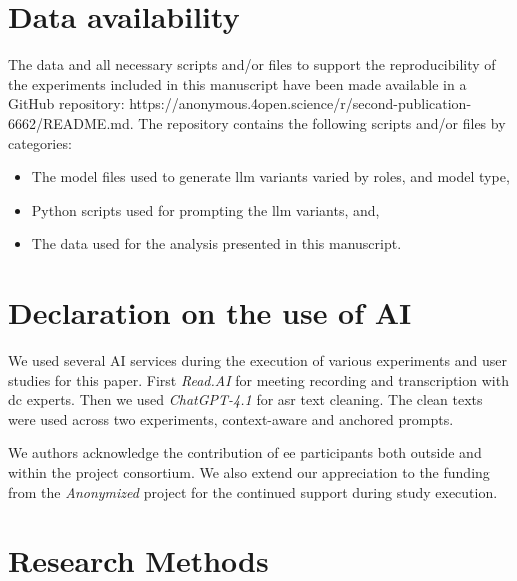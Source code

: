 \documentclass[manuscript,review,anonymous]{acmart}
\begin{document}
\section{Data availability}
The data and all necessary scripts and/or files to support the reproducibility of the experiments included in this manuscript have been made available in a GitHub repository: https://anonymous.4open.science/r/second-publication-6662/README.md. 
The repository contains the following scripts and/or files by categories:
\begin{itemize}
    \item The model files used to generate \gls{llm} variants varied by roles, and model type,
    \item Python scripts used for prompting the \gls{llm} variants, and,
    \item The data used for the analysis presented in this manuscript.
\end{itemize}   

\section{Declaration on the use of AI}
We used several AI services during the execution of various experiments and user studies for this paper. First \textit{Read.AI} for meeting recording and transcription with \gls{dc} experts. Then we used \textit{ChatGPT-4.1} for \gls{asr} text cleaning. The clean texts were used across two experiments, context-aware and anchored prompts.


\begin{acks}
We authors acknowledge the contribution of \gls{ee} participants both outside and within the project consortium. We also extend our appreciation to the funding from the \textit{Anonymized} project for the continued support during study execution.
\end{acks}




\clearpage
\appendix

\section{Research Methods}
\end{document}
